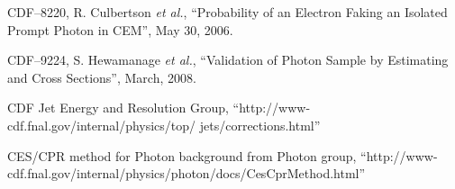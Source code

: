 \documentclass[11pt]{article}
\begin{document}

\begin{thebibliography}{99}

 CDF--8220, R. Culbertson {\it et al.}, ``Probability of an Electron Faking an Isolated Prompt Photon in CEM'', May 30, 2006.

 CDF--9224, S. Hewamanage {\it et al.}, ``Validation of Photon Sample by Estimating \wen and  \zee  Cross Sections'', March, 2008.

 CDF Jet Energy and Resolution Group, ``http://www-cdf.fnal.gov/internal/physics/top/ jets/corrections.html''

 CES/CPR method for Photon background from Photon group, ``http://www-cdf.fnal.gov/internal/physics/photon/docs/CesCprMethod.html''


\end{thebibliography}
\end{document}
